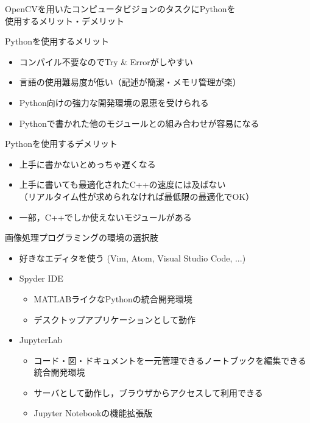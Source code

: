 \documentclass[10pt]{beamer}
\newcommand{\red}[1]{\textcolor{red}{#1}}
\newcommand{\blue}[1]{\textcolor{blue}{#1}}
\begin{document}
	\begin{frame}{OpenCVを用いたコンピュータビジョンのタスクにPythonを\\使用するメリット・デメリット}
	
	    {\large Pythonを使用するメリット \red{\Smiley[1.5]}}
		\begin{itemize}
			\item コンパイル不要なのでTry \& Errorがしやすい
			\item 言語の使用難易度が低い（記述が簡潔・メモリ管理が楽）
			\item Python向けの強力な開発環境の恩恵を受けられる
			\item Pythonで書かれた他のモジュールとの組み合わせが容易になる
		\end{itemize}
		{\large Pythonを使用するデメリット \blue{\Sadey[1.5]}}
		\begin{itemize}
			\item 上手に書かないとめっちゃ遅くなる
			\item 上手に書いても最適化されたC++の速度には及ばない \\
				（リアルタイム性が求められなければ最低限の最適化でOK）
			\item 一部，C++でしか使えないモジュールがある
		\end{itemize}
	\end{frame}

	\begin{frame}{画像処理プログラミングの環境の選択肢}
	    \begin{itemize}
	        \item 好きなエディタを使う (Vim, Atom, Visual Studio Code, ...)
	        \item Spyder IDE
	            \begin{itemize}
	                \item MATLABライクなPythonの統合開発環境
	                \item デスクトップアプリケーションとして動作
	            \end{itemize}
	        \item JupyterLab
	            \begin{itemize}
	                \item コード・図・ドキュメントを一元管理できるノートブックを編集できる統合開発環境
	                \item サーバとして動作し，ブラウザからアクセスして利用できる
	                \item Jupyter Notebookの機能拡張版
	            \end{itemize}
	    \end{itemize}
	\end{frame}
	
\end{document}
